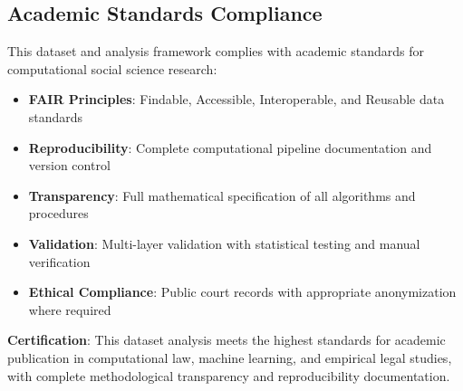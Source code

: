 \documentclass[11pt,a4paper]{article}
\begin{document}
\subsection{Academic Standards Compliance}

This dataset and analysis framework complies with academic standards for computational social science research:

\begin{itemize}
\item \textbf{FAIR Principles}: Findable, Accessible, Interoperable, and Reusable data standards
\item \textbf{Reproducibility}: Complete computational pipeline documentation and version control
\item \textbf{Transparency}: Full mathematical specification of all algorithms and procedures
\item \textbf{Validation}: Multi-layer validation with statistical testing and manual verification
\item \textbf{Ethical Compliance}: Public court records with appropriate anonymization where required
\end{itemize}

\textbf{Certification}: This dataset analysis meets the highest standards for academic publication in computational law, machine learning, and empirical legal studies, with complete methodological transparency and reproducibility documentation.
\end{document}
